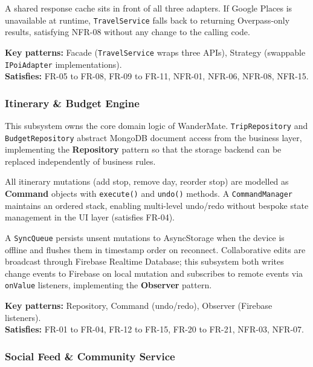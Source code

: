 \documentclass[12pt, a4paper]{article}
\begin{document}
A shared response cache sits in front of all three adapters. If Google Places is unavailable at runtime, \texttt{TravelService} falls back to returning Overpass-only results, satisfying NFR-08 without any change to the calling code.

\begin{tcolorbox}[notebox]
  \textbf{Key patterns:} Facade (\texttt{TravelService} wraps three APIs), Strategy (swappable \texttt{IPoiAdapter} implementations).\\[2pt]
  \textbf{Satisfies:} FR-05 to FR-08, FR-09 to FR-11, NFR-01, NFR-06, NFR-08, NFR-15.
\end{tcolorbox}

\subsubsection{Itinerary \& Budget Engine}

This subsystem owns the core domain logic of WanderMate. \texttt{TripRepository} and \texttt{BudgetRepository} abstract MongoDB document access from the business layer, implementing the \textbf{Repository} pattern so that the storage backend can be replaced independently of business rules.

All itinerary mutations (add stop, remove day, reorder stop) are modelled as \textbf{Command} objects with \texttt{execute()} and \texttt{undo()} methods. A \texttt{CommandManager} maintains an ordered stack, enabling multi-level undo/redo without bespoke state management in the UI layer (satisfies FR-04).

A \texttt{SyncQueue} persists unsent mutations to AsyncStorage when the device is offline and flushes them in timestamp order on reconnect. Collaborative edits are broadcast through Firebase Realtime Database; this subsystem both writes change events to Firebase on local mutation and subscribes to remote events via \texttt{onValue} listeners, implementing the \textbf{Observer} pattern.

\begin{tcolorbox}[notebox]
  \textbf{Key patterns:} Repository, Command (undo/redo), Observer (Firebase listeners).\\[2pt]
  \textbf{Satisfies:} FR-01 to FR-04, FR-12 to FR-15, FR-20 to FR-21, NFR-03, NFR-07.
\end{tcolorbox}

\subsubsection{Social Feed \& Community Service}
\end{document}

